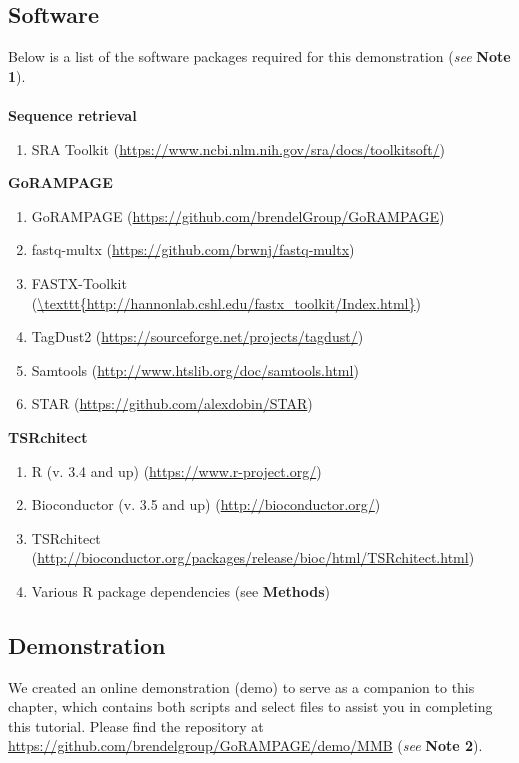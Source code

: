 \documentclass[runningheads,a4paper]{llncs}
\begin{document}
\begin{linenumbers}
\subsection{Software}
Below is a list of the software packages required for this demonstration (\textit{see} \textbf{Note 1}).\\
\\
\textbf{Sequence retrieval}
\begin{enumerate}
\item SRA Toolkit \cite{Leinonen:2011iw}  (\url{https://www.ncbi.nlm.nih.gov/sra/docs/toolkitsoft/})
\end{enumerate}
\textbf{GoRAMPAGE}
\begin{enumerate}
\item GoRAMPAGE \cite{Brendel:2016ab} (\url{https://github.com/brendelGroup/GoRAMPAGE})
\item fastq-multx \cite{Aronesty:2013gt} (\url{https://github.com/brwnj/fastq-multx})
\item FASTX-Toolkit \cite{citeulike:9103573} (\url{\texttt{http://hannonlab.cshl.edu/fastx\_toolkit/Index.html}})
\item TagDust2 \cite{Lassmann:2015gs} (\url{https://sourceforge.net/projects/tagdust/})
\item Samtools \cite{Li:2009ka} (\url{http://www.htslib.org/doc/samtools.html})
\item STAR \cite{Dobin:2016kq} (\url{https://github.com/alexdobin/STAR})
\end{enumerate}
\textbf{TSRchitect}
\begin{enumerate}
\item R (v. 3.4 and up) \cite{RCore:2017ab} (\url{https://www.r-project.org/})
\item Bioconductor (v. 3.5 and up) \cite{Lawrence:2014gy} (\url{http://bioconductor.org/})
\item TSRchitect \cite{Raborn:2017ab} (\url{http://bioconductor.org/packages/release/bioc/html/TSRchitect.html})
\item Various R package dependencies (see \textbf{Methods})
\end{enumerate}

\subsection{Demonstration}
We created an online demonstration (demo) to serve as a companion to this chapter, which contains both scripts and select files to assist you in completing this tutorial.
Please find the repository at \url{https://github.com/brendelgroup/GoRAMPAGE/demo/MMB} (\textit{see} \textbf{Note 2}).


\end{linenumbers}
\end{document}
